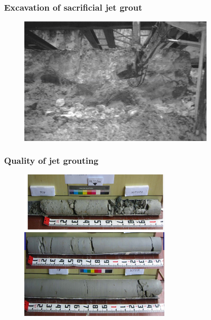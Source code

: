\documentclass[handout]{beamer}
\begin{document}
\begin{frame}
\frametitle{Excavation of sacrificial jet grout}
\begin{figure}[ht]
	\centering
	\includegraphics[width=0.85\textwidth]{figs/excavation-jet-grout.png}
\end{figure}
\end{frame}

\begin{frame}
\frametitle{Quality of jet grouting}
\begin{figure}[ht]
	\centering
	\includegraphics[width=0.65\textwidth]{figs/jet-grout-cores.png}
\end{figure}
\end{frame}
\end{document}
